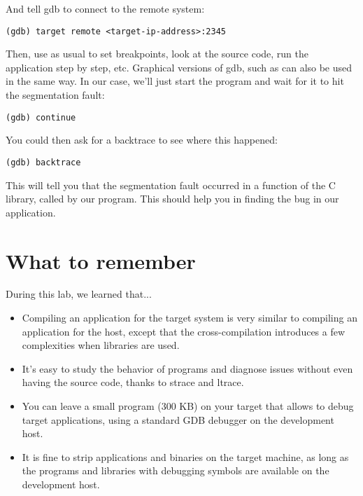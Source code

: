 And tell gdb to connect to the remote system:
\begin{verbatim}
(gdb) target remote <target-ip-address>:2345
\end{verbatim}

Then, use  as usual to set breakpoints, look at the source
code, run the application step by step, etc. Graphical versions of
gdb, such as  can also be used in the same way. In our case,
we'll just start the program and wait for it to hit the segmentation
fault:
\begin{verbatim}
(gdb) continue
\end{verbatim}

You could then ask for a backtrace to see where this happened:
\begin{verbatim}
(gdb) backtrace
\end{verbatim}

This will tell you that the segmentation fault occurred in a function
of the C library, called by our program. This should help you in
finding the bug in our application.

\section{What to remember}

During this lab, we learned that...
\begin{itemize}
\item Compiling an application for the target system is very similar
  to compiling an application for the host, except that the
  cross-compilation introduces a few complexities when libraries are
  used.

\item It's easy to study the behavior of programs and diagnose issues
  without even having the source code, thanks to strace and ltrace.

\item You can leave a small  program (300 KB) on your target
  that allows to debug target applications, using a standard GDB
  debugger on the development host.

\item It is fine to strip applications and binaries on the target
  machine, as long as the programs and libraries with debugging
  symbols are available on the development host.

\end{itemize}

